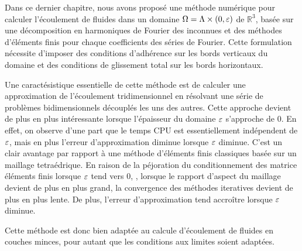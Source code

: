 Dans ce dernier chapitre, nous avons proposé une méthode numérique
pour calculer l'écoulement de fluides dans un domaine
$\Omega = \Lambda\times(0,\varepsilon)$ de $\mathbb R^3$, basée sur une
décomposition en harmoniques de Fourier des inconnues et des
méthodes d'éléments finis pour chaque coefficients des séries de
Fourier. Cette formulation nécessite d'imposer des conditions
d'adhérence sur les bords verticaux du domaine et des conditions de
glissement total sur les bords horizontaux.

Une caractésistique essentielle de cette méthode est de calculer une
approximation de l'écoulement tridimensionnel en résolvant une
série de problèmes bidimensionnels découplés les uns des autres. Cette
approche devient de plus en plus intéressante lorsque l'épaisseur du
domaine $\varepsilon$ s'approche de 0. En effet, on observe d'une part
que le temps CPU est essentiellement indépendent de $\varepsilon$, mais
en plus l'erreur d'approximation diminue lorsque $\varepsilon$
diminue. C'est un clair avantage par rapport à une méthode
d'éléments finis classiques basée sur un maillage tetraédrique. En
raison de la péjoration du conditionnement des matrice éléments
finis lorsque $\varepsilon$ tend vers 0, \ie, lorsque le rapport
d'aspect du maillage devient de plus en plus grand, la convergence des
méthodes iteratives devient de plus en plus lente. De plus, l'erreur
d'approximation tend accroître lorsque $\varepsilon$ diminue.

Cette méthode est donc bien adaptée au calcule d'écoulement de
fluides en couches minces, pour autant que les conditions aux limites
soient adaptées.
